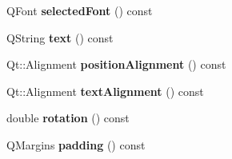 \begin{DoxyCompactItemize}
\item 
Q\+Font {\bfseries selected\+Font} () const \hypertarget{classQCPItemText_af2e7cacb1975132508714a51c5f48c3b}{}\label{classQCPItemText_af2e7cacb1975132508714a51c5f48c3b}

\item 
Q\+String {\bfseries text} () const \hypertarget{classQCPItemText_a9547f7832010486abed0837e75db5330}{}\label{classQCPItemText_a9547f7832010486abed0837e75db5330}

\item 
Qt\+::\+Alignment {\bfseries position\+Alignment} () const \hypertarget{classQCPItemText_af13c6adc480f268116ae72196eb44b06}{}\label{classQCPItemText_af13c6adc480f268116ae72196eb44b06}

\item 
Qt\+::\+Alignment {\bfseries text\+Alignment} () const \hypertarget{classQCPItemText_aaa1d84b3f61f9f2a0cce230e66ef7194}{}\label{classQCPItemText_aaa1d84b3f61f9f2a0cce230e66ef7194}

\item 
double {\bfseries rotation} () const \hypertarget{classQCPItemText_ae8991207fa1697511c1c8af9f3ca0e0a}{}\label{classQCPItemText_ae8991207fa1697511c1c8af9f3ca0e0a}

\item 
Q\+Margins {\bfseries padding} () const \hypertarget{classQCPItemText_a00e0fa03822ff384bf4921c1c90322ff}{}\label{classQCPItemText_a00e0fa03822ff384bf4921c1c90322ff}


\end{DoxyCompactItemize}

